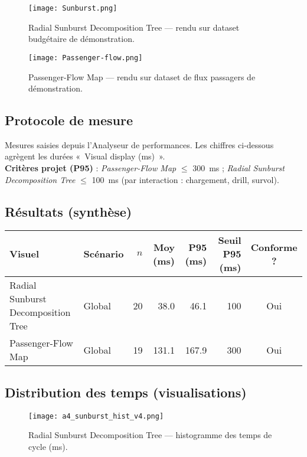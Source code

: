 \begin{figure}[h]
  \centering
  \texttt{[image: Sunburst.png]}
  \caption{Radial Sunburst Decomposition Tree — rendu sur dataset budgétaire de démonstration.}
  \label{fig:a3-sunburst-demo}
\end{figure}

\begin{figure}[h]
  \centering
  \texttt{[image: Passenger-flow.png]}
  \caption{Passenger-Flow Map — rendu sur dataset de flux passagers de démonstration.}
  \label{fig:a3-passenger-demo}
\end{figure}

\subsection{Protocole de mesure}
Mesures saisies depuis l’Analyseur de performances. Les chiffres ci-dessous agrègent les durées «~Visual display (ms)~».\\
\textbf{Critères projet (P95)} : \textit{Passenger-Flow Map} \(\leq\) 300~ms ; \textit{Radial Sunburst Decomposition Tree} \(\leq\) 100~ms (par interaction : chargement, drill, survol).

\subsection{Résultats (synthèse)}
\begin{table}[h]
\scriptsize
\setlength{\tabcolsep}{3pt}
\centering
\begin{tabularx}{\linewidth}{l l r r r r c}
\toprule
\textbf{Visuel} & \textbf{Scénario} & \textbf{$n$} & \textbf{Moy (ms)} & \textbf{P95 (ms)} & \textbf{Seuil P95 (ms)} & \textbf{Conforme ?} \\
\midrule
Radial Sunburst Decomposition Tree & Global & 20 & 38.0 & 46.1 & 100 & Oui \\
Passenger-Flow Map & Global & 19 & 131.1 & 167.9 & 300 & Oui \\
\bottomrule
\end{tabularx}
\end{table}

\subsection{Distribution des temps (visualisations)}
\begin{figure}[h]
  \centering
  \texttt{[image: a4\_sunburst\_hist\_v4.png]}
  \caption{Radial Sunburst Decomposition Tree — histogramme des temps de cycle (ms).}
\end{figure}

